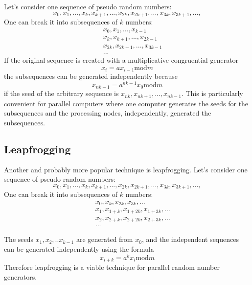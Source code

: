 \documentclass[justified, sixbynine]{tufte-book}
\theoremstyle{plain}%
\newtheorem * {corollary}{Corollary}
\theoremstyle{definition}
\theoremstyle{remark}
\newtheorem * {remark}{Remark}
\newtheorem * {note}{Note}
\begin{document}
\begin{fullwidth}
Let's consider one sequence of pseudo random numbers:
\begin{equation}
x_0, x_1, ..., x_k, x_{k+1}, ..., x_{2k}, x_{2k+1}, ..., x_{3k}, x_{3k+1}, ...,
\end{equation}
One can break it into subsequences of $k$ numbers:
\begin{eqnarray}
&&x_0, x_1, ..., x_{k-1} \\
&&x_k, x_{k+1}, ..., x_{2k-1} \\
&&x_{2k}, x_{2k+1}, ..., x_{3k-1} \\
&&...
\end{eqnarray}
If the original sequence is created with a multiplicative congruential
generator
\begin{equation}
x_i=ax_{i-1}\textrm{mod}m
\end{equation}
the subsequences can be generated independently because
\begin{equation}
x_{nk-1}=a^{nk-1}x_0\textrm{mod}m
\end{equation}
if the seed of the arbitrary sequence is $x_{nk}, x_{nk+1}, ..., x_{nk-1}$. This
is particularly convenient for parallel computers where one computer
generates the seeds for the subsequences and the processing nodes,
independently, generated the subsequences.

\goodbreak\subsection{Leapfrogging}

Another and probably more popular technique is leapfrogging.
Let's consider one sequence of pseudo random numbers:
\begin{equation}
x_0, x_1, ..., x_k, x_{k+1}, ..., x_{2k}, x_{2k+1}, ..., x_{3k}, x_{3k+1}, ...,
\end{equation}
One can break it into subsequences of $k$ numbers:
\begin{eqnarray}
&&x_0, x_k, x_{2k}, x_{3k}, ... \\
&&x_1, x_{1+k}, x_{1+2k}, x_{1+3k}, ... \\
&&x_2, x_{2+k}, x_{2+2k}, x_{2+3k}, ... \\
&&...
\end{eqnarray}

The seeds $x_1, x_2, ..x_{k-1}$ are generated from $x_0$, and the independent
sequences can be generated independently using the formula
\begin{equation}
x_{i+k}=a^kx_i\textrm{mod}m
\end{equation}
Therefore leapfrogging is a viable technique for parallel random number
generators.


\end{fullwidth}
\end{document}
